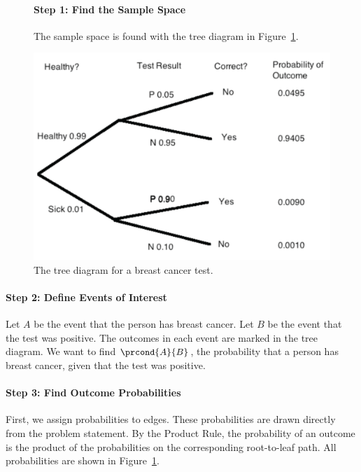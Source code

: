 \begin{figure}[htbp]

\paragraph{Step 1: Find the Sample Space}

The sample space is found with the tree diagram in
Figure~\ref{fig:15C1}.

\centerline{\includegraphics[width=.9\textwidth]{figures/drafts/mammo-tree}}
\caption{The tree diagram for a breast cancer test.}
\label{fig:15C1}
\end{figure}

\paragraph{Step 2: Define Events of Interest}

Let $A$ be the event that the person has breast cancer.  Let $B$ be the
event that the test was positive.  The outcomes in each event are marked
in the tree diagram.  We want to find $\prcond{A}{B}$, the probability
that a person has breast cancer, given that the test was positive.

\paragraph{Step 3: Find Outcome Probabilities}

First, we assign probabilities to edges.  These probabilities are
drawn directly from the problem statement.  By the Product Rule, the
probability of an outcome is the product of the probabilities on the
corresponding root-to-leaf path.  All probabilities are shown in
Figure~\ref{fig:15C1}.

